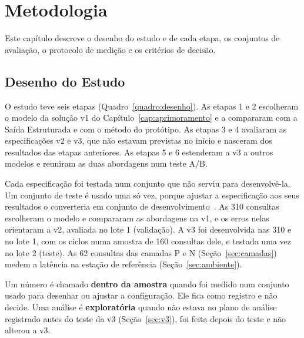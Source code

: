 \chapter{Metodologia}
\label{cap:metodologia}

Este capítulo descreve o desenho do estudo e de cada etapa, os conjuntos de avaliação, o protocolo de medição e os critérios de decisão.

\section{Desenho do Estudo}
\label{sec:desenho}

O estudo teve seis etapas (Quadro~\ref{quadro:desenho}). As etapas 1 e 2 escolheram o modelo da solução v1 do Capítulo~\ref{cap:aprimoramento} e a compararam com a Saída Estruturada e com o método do protótipo. As etapas 3 e 4 avaliaram as especificações v2 e v3, que não estavam previstas no início e nasceram dos resultados das etapas anteriores. As etapas 5 e 6 estenderam a v3 a outros modelos e reuniram as duas abordagens num teste A/B.

Cada especificação foi testada num conjunto que não serviu para desenvolvê-la. Um conjunto de teste é usado uma só vez, porque ajustar a especificação aos seus resultados o converteria em conjunto de desenvolvimento~\cite{dwork2015reusable}. As 310 consultas escolheram o modelo e compararam as abordagens na v1, e os erros nelas orientaram a v2, avaliada no lote 1 (validação). A v3 foi desenvolvida nas 310 e no lote 1, com os ciclos numa amostra de 160 consultas dele, e testada uma vez no lote 2 (teste). As 62 consultas das camadas P e N (Seção~\ref{sec:camadas}) medem a latência na estação de referência (Seção~\ref{sec:ambiente}).

Um número é chamado \textbf{dentro da amostra} quando foi medido num conjunto usado para desenhar ou ajustar a configuração. Ele fica como registro e não decide. Uma análise é \textbf{exploratória} quando não estava no plano de análise registrado antes do teste da v3 (Seção~\ref{sec:v3}), foi feita depois do teste e não alterou a v3.

